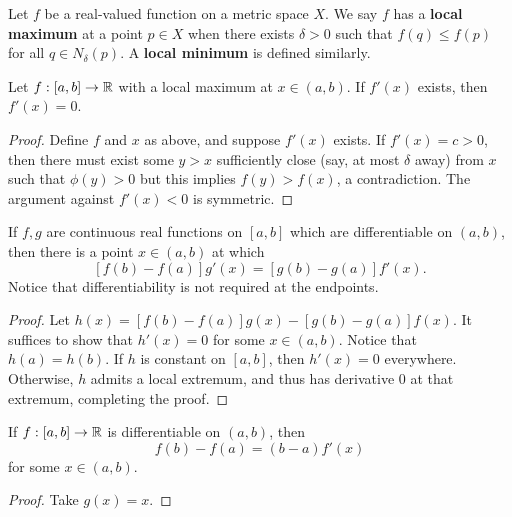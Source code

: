 \begin{definition} %
    Let $f$ be a real-valued function on a metric space $X$. We say $f$ has a \textbf{local maximum} at a point $p \in X$ when there exists $\delta > 0$ such that $f(q) \le f(p)$ for all $q \in N_\delta(p)$. A \textbf{local minimum} is defined similarly.
\end{definition}

\begin{theorem} %
    Let $f: [a, b] \rightarrow \mathbb{R}$ with a local maximum at $x \in (a, b)$. If $f'(x)$ exists, then $f'(x) = 0$.

    \begin{proof}
        Define $f$ and $x$ as above, and suppose $f'(x)$ exists. If $f'(x) = c > 0$, then there must exist some $y > x$ sufficiently close (say, at most $\delta$ away) from $x$ such that $\phi(y) > 0$ but this implies $f(y) > f(x)$, a contradiction. The argument against $f'(x) < 0$ is symmetric.
    \end{proof}
\end{theorem}

\begin{theorem} %
    If $f, g$ are continuous real functions on $[a, b]$ which are differentiable on $(a, b)$, then there is a point $x \in (a, b)$ at which
    \[
        [f(b) - f(a)] g'(x) = [g(b) - g(a)] f'(x).
    \]
    Notice that differentiability is not required at the endpoints.

    \begin{proof}
        Let $h(x) = [f(b) - f(a)] g(x) - [g(b) - g(a)] f(x)$. It suffices to show that $h'(x) = 0$ for some $x \in (a, b)$. Notice that $h(a) = h(b)$. If $h$ is constant on $[a, b]$, then $h'(x) = 0$ everywhere. Otherwise, $h$ admits a local extremum, and thus has derivative $0$ at that extremum, completing the proof.
    \end{proof}
\end{theorem}

\begin{corollary} %
    If $f: [a, b] \rightarrow \mathbb{R}$ is differentiable on $(a, b)$, then 
    \[
        f(b) - f(a) = (b - a) f'(x)
    \]
    for some $x \in (a, b)$.

    \begin{proof}
        Take $g(x) = x$.
    \end{proof}
\end{corollary}

